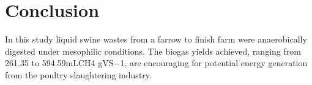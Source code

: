 \section{Conclusion}
In this study liquid swine wastes from a farrow to finish farm were anaerobically digested under mesophilic conditions. The biogas yields achieved, ranging from 261.35 to 594.59mLCH4 gVS−1, are encouraging for potential energy generation from the poultry slaughtering industry.